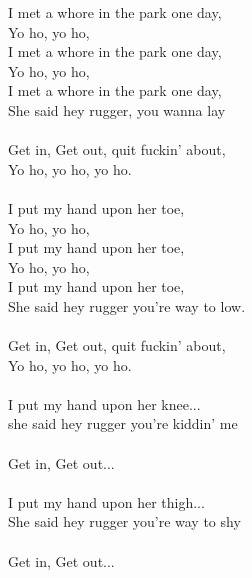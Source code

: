 
            I met a whore in the park one day,  \\
            Yo ho, yo ho, \\
            I met a whore in the park one day,  \\
            Yo ho, yo ho, \\
            I met a whore in the park one day,  \\
            She said hey rugger, you wanna lay \\
\hspace{10mm} \\
            Get in, Get out, quit fuckin' about,  \\
            Yo ho, yo ho, yo ho. \\
\hspace{10mm} \\
            I put my hand upon her toe, \\
            Yo ho, yo ho,  \\
            I put my hand upon her toe, \\
            Yo ho, yo ho,  \\
            I put my hand upon her toe, \\
            She said hey rugger you're way to low. \\
\hspace{10mm} \\
            Get in, Get out, quit fuckin' about,  \\
            Yo ho, yo ho, yo ho. \\
\hspace{10mm} \\
            I put my hand upon her knee...  \\
            she said hey rugger you're kiddin' me \\
\hspace{10mm} \\
            Get in, Get out...  \\
\hspace{10mm} \\
            I put my hand upon her thigh... \\
            She said hey rugger you're way to shy \\
\hspace{10mm} \\
            Get in, Get out... \\
